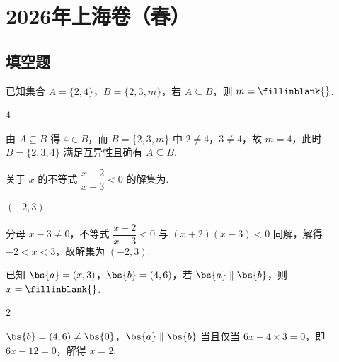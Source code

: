 \documentclass[UTF8,a4paper,oneside,11pt]{ctexbook}
\begin{document}
\mainmatter

\chapter{2026年上海卷（春）}

\section{填空题}

\begin{problem}
已知集合 \(A=\{2,4\}\)，\(B=\{2,3,m\}\)，若 \(A\subseteq B\)，则 \(m=\fillinblank{}\).
\end{problem}

\begin{answer}
\(4\)
\end{answer}

\begin{solution}
由 \(A\subseteq B\) 得 \(4\in B\)，而 \(B=\{2,3,m\}\) 中 \(2\ne4\)，\(3\ne4\)，故 \(m=4\)，此时 \(B=\{2,3,4\}\) 满足互异性且确有 \(A\subseteq B\).
\end{solution}

\begin{problem}
关于 \(x\) 的不等式 \(\dfrac{x+2}{x-3}<0\) 的解集为\fillinblank{}.
\end{problem}

\begin{answer}
\((-2,3)\)
\end{answer}

\begin{solution}
分母 \(x-3\ne0\)，不等式 \(\dfrac{x+2}{x-3}<0\) 与 \((x+2)(x-3)<0\) 同解，解得 \(-2<x<3\)，故解集为 \((-2,3)\).
\end{solution}

\begin{problem}
已知 \(\bs{a}=(x,3)\)，\(\bs{b}=(4,6)\)，若 \(\bs{a}\parallel\bs{b}\)，则 \(x=\fillinblank{}\).
\end{problem}

\begin{answer}
\(2\)
\end{answer}

\begin{solution}
\(\bs{b}=(4,6)\ne\bs{0}\)，\(\bs{a}\parallel\bs{b}\) 当且仅当 \(6x-4\times3=0\)，即 \(6x-12=0\)，解得 \(x=2\).
\end{solution}
\end{document}
